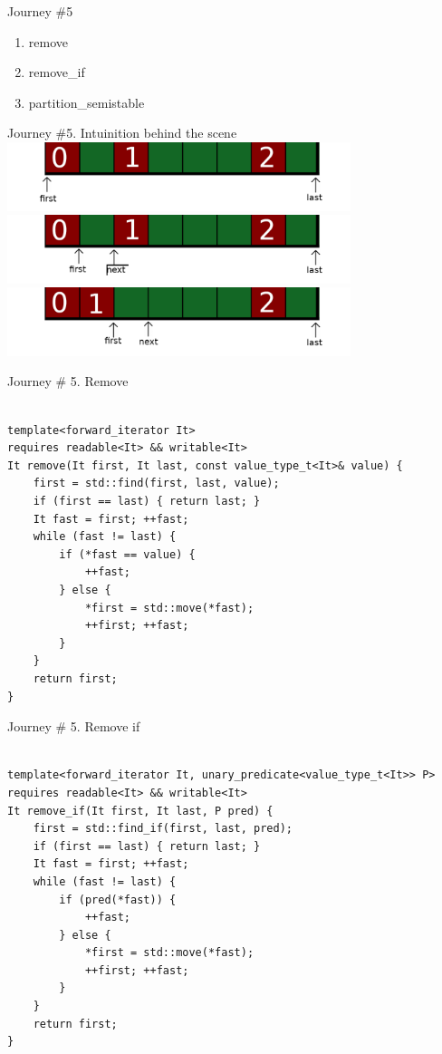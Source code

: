 \documentclass[10pt]{beamer}
\begin{document}
\begin{frame}{Journey \#5}
    \begin{enumerate}
        \item remove
        \item remove\_if
        \item partition\_semistable
    \end{enumerate}
\end{frame}

\begin{frame}{Journey \#5. Intuinition behind the scene}
    \includegraphics[height=2cm]{images/partition-1.png}
    \includegraphics[height=2cm]{images/partition-2.png}
    \includegraphics[height=2cm]{images/partition-3.png}
\end{frame}




\begin{frame}[fragile]{Journey \# 5. Remove}
\begin{lstlisting}[style=cpp] %%%%%%%

template<forward_iterator It>
requires readable<It> && writable<It>
It remove(It first, It last, const value_type_t<It>& value) {
    first = std::find(first, last, value);
    if (first == last) { return last; }
    It fast = first; ++fast;
    while (fast != last) {
        if (*fast == value) {
            ++fast;
        } else {
            *first = std::move(*fast);
            ++first; ++fast;
        }
    }
    return first;
}

\end{lstlisting}
\end{frame}


\begin{frame}[fragile]{Journey \# 5. Remove if}
\begin{lstlisting}[style=cpp] %%%%%%%

template<forward_iterator It, unary_predicate<value_type_t<It>> P>
requires readable<It> && writable<It>
It remove_if(It first, It last, P pred) {
    first = std::find_if(first, last, pred);
    if (first == last) { return last; }
    It fast = first; ++fast;
    while (fast != last) {
        if (pred(*fast)) {
            ++fast;
        } else {
            *first = std::move(*fast);
            ++first; ++fast;
        }
    }
    return first;
}

\end{lstlisting}
\end{frame}
\end{document}
